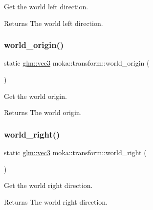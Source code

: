 Get the world left direction. 

\begin{DoxyReturn}{Returns}
The world left direction. 
\end{DoxyReturn}
\mbox{\label{classmoka_1_1transform_ab952e9b252cd2f5a0256e1aa0c9743c0}} 
\subsubsection{\texorpdfstring{world\_origin()}{world\_origin()}}
{\footnotesize\ttfamily static \mbox{\hyperlink{namespacemoka_aed2224bc0e5b79e57a8975ded94ee1aaa97ade28e93c0de60adc075bdbe07ca36}{glm\+::vec3}} moka\+::transform\+::world\+\_\+origin (\begin{DoxyParamCaption}{ }\end{DoxyParamCaption})\hspace{0.3cm}{\ttfamily [static]}}



Get the world origin. 

\begin{DoxyReturn}{Returns}
The world origin. 
\end{DoxyReturn}
\mbox{\label{classmoka_1_1transform_a8f3d35d28a475aa3e232825cb335b6e1}} 
\subsubsection{\texorpdfstring{world\_right()}{world\_right()}}
{\footnotesize\ttfamily static \mbox{\hyperlink{namespacemoka_aed2224bc0e5b79e57a8975ded94ee1aaa97ade28e93c0de60adc075bdbe07ca36}{glm\+::vec3}} moka\+::transform\+::world\+\_\+right (\begin{DoxyParamCaption}{ }\end{DoxyParamCaption})\hspace{0.3cm}{\ttfamily [static]}}



Get the world right direction. 

\begin{DoxyReturn}{Returns}
The world right direction. 
\end{DoxyReturn}
\mbox{\label{classmoka_1_1transform_afb4410934686c722f0215a06a7984d61}} 
